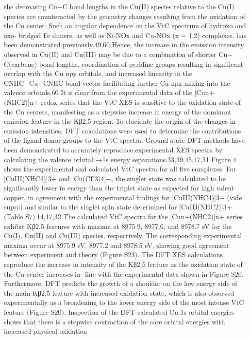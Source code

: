 \documentclass{article}
\begin{document}
the decreasing Cu−C bond lengths in the Cu(II) species
relative to the Cu(I) species are counteracted by the geometry
changes resulting from the oxidation of the Cu center. Such an
angular dependence on the VtC spectrum of hydroxo and oxo-
bridged Fe dimers, as well as Ni-NOx and Cu-NOx (x = 1,2)
complexes, has been demonstrated previously.49,60 Hence, the
increase in the emission intensity observed in Cu(II) and
Cu(III) may be due to a combination of shorter Cu−
C(carbene) bond lengths, coordination of pyridine groups
resulting in signiﬁcant overlap with the Cu npy orbitals, and
increased linearity in the CNHC−Cu−CNHC bond vector
facilitating further Cu npx mixing into the valence orbitals.60
It is clear from the experimental data of the [Cun+(NHC2)]n+
redox series that the VtC XES is sensitive to the oxidation state
of the Cu centers, manifesting as a stepwise increase in energy
of the dominant emission feature in the Kβ2,5 region.
To elucidate the origin of the changes in emission
intensities, DFT calculations were used to determine the
contributions of the ligand donor groups to the VtC spectra.
Ground-state DFT methods have been demonstrated to
accurately reproduce experimental XES spectra by calculating
the valence orbital →1s energy separations.33,39,45,47,51 Figure
4 shows the experimental and calculated VtC spectra for all ﬁve
complexes. For [CuIII(NHC4)]3+ and [Cu(CF3)4]−, the singlet
state was calculated to be signiﬁcantly lower in energy than the
triplet state as expected for high valent copper, in agreement
with the experimental ﬁndings for [CuIII(NHC4)]3+ (vide
supra) and similar to the singlet spin state determined for
[CuIII(NHC2)]3+ (Table S7).14,17,32
The calculated VtC spectra for the [Cun+(NHC2)]n+ series
exhibit Kβ2,5 features with maxima at 8975.9, 8977.6, and
8978.7 eV for the Cu(I), Cu(II) and Cu(III) species,
respectively. The corresponding experimental maxima occur
at 8975.9 eV, 8977.2 and 8978.5 eV, showing good agreement
between experiment and theory (Figure S23). The DFT XES
calculations reproduce the increase in intensity of the Kβ2,5
feature as the oxidation state of the Cu center increasesin-
line with the experimental data shown in Figure S20.
Furthermore, DFT predicts the growth of a shoulder on the
low energy side of the main Kβ2,5 feature with increased
oxidation state, which is also observed experimentally as a
broadening to the lower energy side of the most intense VtC
feature (Figure S20). Inspection of the DFT-calculated Cu 1s
orbital energies shows that there is a stepwise contraction of
the core orbital energies with increased physical oxidation
\end{document}
